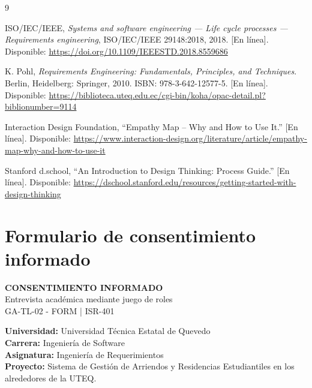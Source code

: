 \documentclass[12pt,a4paper]{article}
\begin{document}
{}
\begin{thebibliography}{9}

ISO/IEC/IEEE,
\textit{Systems and software engineering --- Life cycle processes --- Requirements engineering},
ISO/IEC/IEEE 29148:2018, 2018.
[En línea]. Disponible:
\url{https://doi.org/10.1109/IEEESTD.2018.8559686}


K. Pohl,
\textit{Requirements Engineering:
Fundamentals, Principles, and Techniques}.
Berlin, Heidelberg: Springer, 2010.
ISBN: 978-3-642-12577-5.
[En línea]. Disponible:
\url{https://biblioteca.uteq.edu.ec/cgi-bin/koha/opac-detail.pl?biblionumber=9114}


Interaction Design Foundation,
``Empathy Map -- Why and How to Use It.''
[En línea]. Disponible:
\url{https://www.interaction-design.org/literature/article/empathy-map-why-and-how-to-use-it}

Stanford d.school,
``An Introduction to Design Thinking: Process Guide.''
[En línea]. Disponible:
\url{https://dschool.stanford.edu/resources/getting-started-with-design-thinking}

\end{thebibliography}




\clearpage
\appendix

\section{Formulario de consentimiento informado}

\begin{center}
    {\large\bfseries CONSENTIMIENTO INFORMADO}\\[0.3cm]
    {\small Entrevista académica mediante juego de roles}\\[0.2cm]
    {\small GA-TL-02 - FORM | ISR-401}
\end{center}

\vspace{0.15cm}

\noindent
\textbf{Universidad:} Universidad Técnica Estatal de Quevedo\\
\textbf{Carrera:} Ingeniería de Software\\
\textbf{Asignatura:} Ingeniería de Requerimientos\\
\textbf{Proyecto:} Sistema de Gestión de Arriendos y
Residencias Estudiantiles en los alrededores de la UTEQ.
\end{document}
